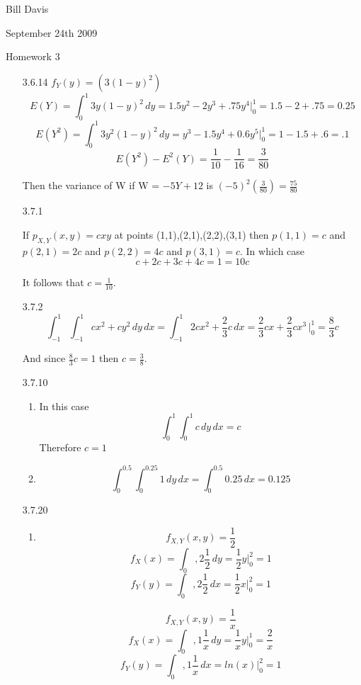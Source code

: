 \documentclass[11pt,fleqn]{article}
\begin{document}
\newcommand{\mbf}[1]{\mbox{{\bfseries #1}}}
\newcommand{\N}{\mbf{N}}
\renewcommand{\O}{\mbf{O}}
\newcommand{\tabfrac}[2]{%
	\setlength{\fboxrule}{0pt}%
	\fbox{$\frac{#1}{#2}$}%
}

\noindent Bill Davis 

\noindent September 24th 2009 

\noindent Homework 3

\begin{enumerate} 
  
\item[3.6.14]
$f_Y(y) = (3(1-y)^2) $
\[
E(Y) = \int_0^1 3y(1-y)^2 \,dy =1.5y^2 - 2y^3 + .75y^4 |_0^1  = 1.5-2+.75 =
0.25
\]
\[ 
E(Y^2) = \int_0^1 3y^2(1-y)^2 \,dy =y^3-1.5y^4+0.6y^5 |_0^1 = 1-1.5+.6 = .1
\]
\[
E(Y^2) - E^2(Y) = \frac{1}{10} - \frac{1}{16} = \frac{3}{80}
\]

Then the variance of W if W = $-5Y+12$ is $(-5)^2(\frac{3}{80}) = \frac{75}{80}$
\item[3.7.1]

If $p_{X,Y}(x,y) = cxy$ at points (1,1),(2,1),(2,2),(3,1) then $p(1,1) = c$ and
$p(2,1) = 2c$ and $p(2,2) = 4c$ and $p(3,1) = c$. In which case 
\[
c + 2c + 3c + 4c = 1 = 10c
\] 

It follows that $c=\frac{1}{10}$.

\item[3.7.2]
\[
\int_{-1}^1 \int_{-1}^1 cx^2+cy^2\,dy\,dx = \int_{-1}^{1} 2cx^2 +
\frac{2}{3}{c} \, dx = \frac{2}{3}cx + \frac{2}{3}cx^3 \, |_0^1 = \frac{8}{3}c
\]

And since $\frac{8}{3}c = 1$ then	 $c = \frac{3}{8}$.

\item[3.7.10]
\begin{enumerate}
  \item
	In this case 
	\[
	\int_0^1\int_0^1 c \,dy\,dx = c
	\]
	Therefore $c=1$
  \item
  \[
  	\int_0^{0.5}\int_0^{0.25} 1 \,dy\,dx = \int_0^{0.5} 0.25 \,dx = 0.125
 \]
\end{enumerate}
\item[3.7.20]

\begin{enumerate}
  \item
\[
f_{X,Y}(x,y) = \frac{1}{2}
\]
\[
f_X(x) = \int_0,2 \frac{1}{2}\,dy = \frac{1}{2}y |_0^2 = 1
\]
\[
f_Y(y) = \int_0,2 \frac{1}{2}\,dx = \frac{1}{2}x |_0^2 = 1
\]

\items
\[
f_{X,Y}(x,y) =  \frac{1}{x}
\]
\[
f_X(x) = \int_0,1 \frac{1}{x}\,dy = \frac{1}{x}y |_0^1 = \frac{2}{x}
\]
\[
f_Y(y) = \int_0,1 \frac{1}{x}\,dx = ln(x)|_0^2 = 1
\]
\end{enumerate}


\end{enumerate}
\end{document}
